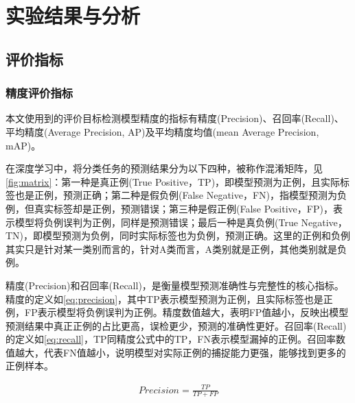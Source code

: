 \chapter{实验结果与分析}

\section{评价指标}

\subsection{精度评价指标}
本文使用到的评价目标检测模型精度的指标有精度(Precision)、召回率(Recall)、平均精度(Average Precision, AP)及平均精度均值(mean Average Precision, mAP)。

在深度学习中，将分类任务的预测结果分为以下四种，被称作混淆矩阵，见\ref{fig:matrix}：第一种是真正例(True Positive，TP)，即模型预测为正例，且实际标签也是正例，预测正确；第二种是假负例(False Negative，FN)，指模型预测为负例，但真实标签却是正例，预测错误；第三种是假正例(False Positive，FP)，表示模型将负例误判为正例，同样是预测错误；最后一种是真负例(True Negative，TN)，即模型预测为负例，同时实际标签也为负例，预测正确。这里的正例和负例其实只是针对某一类别而言的，针对A类而言，A类别就是正例，其他类别就是负例。

精度(Precision)和召回率(Recall)，是衡量模型预测准确性与完整性的核心指标。精度的定义如\ref{eq:precision}，其中TP表示模型预测为正例，且实际标签也是正例，FP表示模型将负例误判为正例。精度数值越大，表明FP值越小，反映出模型预测结果中真正正例的占比更高，误检更少，预测的准确性更好。召回率(Recall)的定义如\ref{eq:recall}，TP同精度公式中的TP，FN表示模型漏掉的正例。召回率数值越大，代表FN值越小，说明模型对实际正例的捕捉能力更强，能够找到更多的正例样本。


\begin{equation}
    \begin{aligned}
    Precision = \frac{TP}{TP + FP}\label{eq:precision}
    \end{aligned}
\end{equation}


